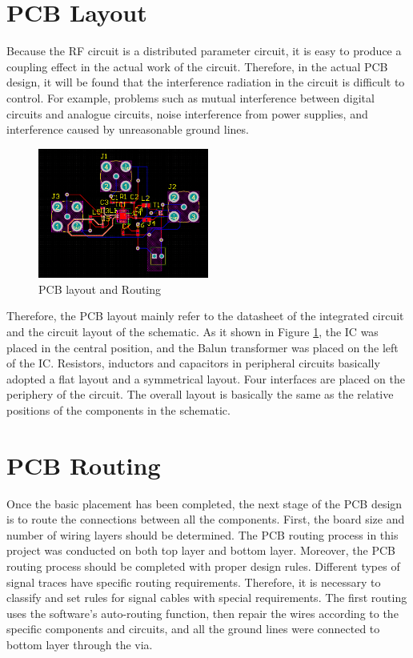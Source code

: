 \documentclass[12pt, a4paper]{report}
\begin{document}
\section{PCB Layout}

Because the RF circuit is a distributed parameter circuit, it is easy to produce a coupling effect in the actual work of the circuit. Therefore, in the actual PCB design, it will be found that the interference radiation in the circuit is difficult to control. For example, problems such as mutual interference between digital circuits and analogue circuits, noise interference from power supplies, and interference caused by unreasonable ground lines. 

\begin{figure}[htbp]     \begin{centering}
    \includegraphics[width=0.5\textwidth]{img/e0.png}
    \caption{\label{Fig:e0}PCB layout and Routing}
    \end{centering}
   
\end{figure}

Therefore, the PCB layout mainly refer to the datasheet of the integrated circuit and the circuit layout of the schematic. As it shown in Figure \ref{Fig:e0}, the IC was placed in the central position, and the Balun transformer was placed on the left of the IC. Resistors, inductors and capacitors in peripheral circuits basically adopted a flat layout and a symmetrical layout. Four interfaces are placed on the periphery of the circuit. The overall layout is basically the same as the relative positions of the components in the schematic.



\section{PCB Routing}

Once the basic placement has been completed, the next stage of the PCB design is to route the connections between all the components. First, the board size and number of wiring layers should be determined. The PCB routing process in this project was conducted on both top layer and bottom layer. Moreover, the PCB routing process should be completed with proper design rules. Different types of signal traces have specific routing requirements. Therefore, it is necessary to classify and set rules for signal cables with special requirements. The first routing uses the software's auto-routing function, then repair the wires according to the specific components and circuits, and all the ground lines were connected to bottom layer through the via.
\end{document}
